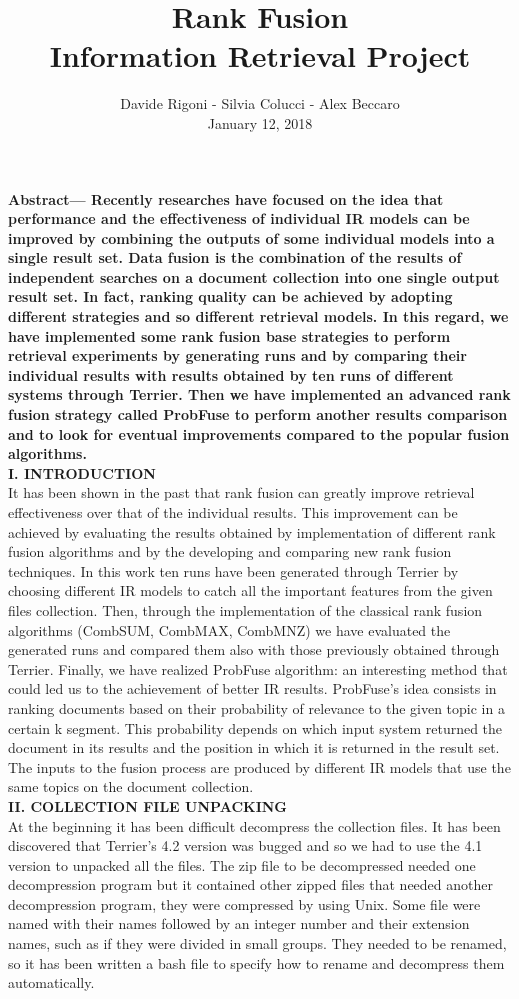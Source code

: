\documentclass[12pt,journal]{IEEEtran}
\title{Rank Fusion \\ {\huge Information Retrieval Project}}
\author{Davide Rigoni - Silvia Colucci - Alex Beccaro \\ January 12, 2018}
\begin{document}
	\maketitle
	\textbf {Abstract— Recently researches have focused on the idea that performance and the effectiveness of individual IR models can be improved by combining the outputs of some individual models into a single result set. Data fusion is the combination of the results of independent searches on a document collection into one single output result set. In fact, ranking quality can be achieved by adopting different strategies and so different retrieval models.
In this regard, we have implemented some rank fusion base strategies to perform retrieval experiments by generating runs and by comparing their individual results with results obtained by ten runs of different systems through Terrier.
Then we have implemented an advanced rank fusion strategy called ProbFuse to perform another results comparison and to look for eventual improvements compared to the popular fusion algorithms.} \\

\textbf{I. INTRODUCTION} \\
It has been shown in the past that rank fusion can greatly improve retrieval effectiveness over that of the individual results.
This improvement can be achieved by evaluating the results obtained by implementation of different rank fusion algorithms and by the developing and comparing new rank fusion techniques.
In this work ten runs have been generated through Terrier by choosing different IR models to catch all the important features from the given files collection. Then, through the implementation of the classical rank fusion algorithms (CombSUM, CombMAX, CombMNZ) we have evaluated the generated runs and compared them also with those previously obtained through Terrier. 
Finally, we have realized ProbFuse algorithm: an interesting method that could led us to the achievement of better IR results.
ProbFuse’s idea consists in ranking documents based on their probability of relevance to the given topic in a certain k segment. This probability depends on which input system returned the document in its results and the position in which it is returned in the result set. 
The inputs to the fusion process are produced by different IR models that use the same topics on the document collection.\\

\textbf{II.	COLLECTION FILE UNPACKING} \\
At the beginning it has been difficult decompress the collection files. It has been discovered that Terrier’s 4.2 version was bugged and so we had to use the 4.1 version to unpacked all the files.
The zip file to be decompressed needed one decompression program but it contained other zipped files that needed another decompression program, they were compressed by using Unix. Some file were named with their names followed by an integer number and their extension names, such as if they were divided in small groups. They needed to be renamed, so it has been written a bash file to specify how to rename and decompress them automatically. \\
\end{document}
